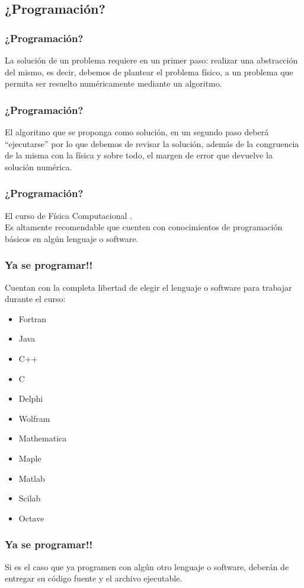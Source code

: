 \documentclass[12pt]{beamer}
\begin{document}
\subsection{¿Programación?}
\begin{frame}
\frametitle{¿Programación?}
La solución de un problema requiere en un primer paso:  realizar una abstracción del mismo, es decir, debemos de plantear el problema físico, a un problema que permita ser resuelto numéricamente mediante un algoritmo.
\end{frame}
\begin{frame}
\frametitle{¿Programación?}
El algoritmo que se proponga como solución, en un segundo paso deberá \enquote{ejecutarse} por lo que debemos de revisar la solución, además de la congruencia de la misma con la física y sobre todo, el margen de error que devuelve la solución numérica.
\end{frame}
\begin{frame}
\frametitle{¿Programación?}
El curso de Física Computacional .
\\
\bigskip
Es altamente recomendable que cuenten con conocimientos de programación básicos en algún lenguaje o software.
\end{frame}
\begin{frame}
\frametitle{Ya se programar!!}
Cuentan con la completa libertad de elegir el lenguaje o software para trabajar durante el curso:
\begin{multicols}{2}
\begin{itemize}
\item Fortran
\item Java
\item C++
\item C
\item Delphi
\item Wolfram
\item Mathematica
\item Maple
\item Matlab
\item Scilab
\item Octave
\end{itemize}
\end{multicols}
\end{frame}
\begin{frame}
\frametitle{Ya se programar!!}
Si es el caso que ya programen con algún otro lenguaje o software, deberán de entregar su código fuente y el archivo ejecutable.
\end{frame}
\end{document}
